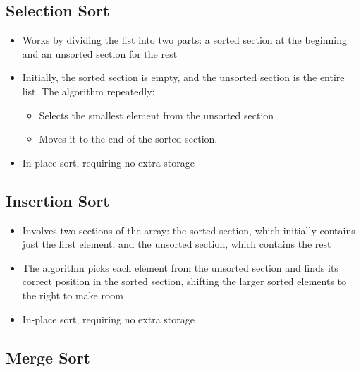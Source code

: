 \documentclass{article}
\begin{document}
\subsection{Selection Sort}

\begin{itemize}
    \item Works by dividing the list into two parts: a sorted section at the beginning and an unsorted section for the rest
    \item Initially, the sorted section is empty, and the unsorted section is the entire list. The algorithm repeatedly:
    \begin{itemize}
        \item Selects the smallest element from the unsorted section
        \item Moves it to the end of the sorted section.
    \end{itemize}
    \item In-place sort, requiring no extra storage
\end{itemize}

\subsection{Insertion Sort}

\begin{itemize}
    \item Involves two sections of the array: the sorted section, which initially contains just the first element, and the unsorted section, which contains the rest
    \item The algorithm picks each element from the unsorted section and finds its correct position in the sorted section, shifting the larger sorted elements to the right to make room
    \item In-place sort, requiring no extra storage
\end{itemize}

\subsection{Merge Sort}
\end{document}

